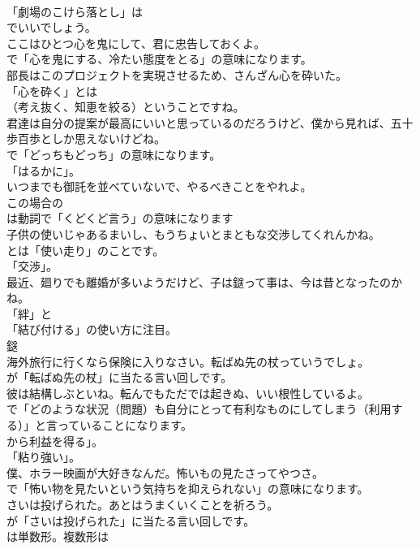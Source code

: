 \documentclass[8pt]{extreport}
\begin{document}
\begin{CJK}{UTF8}{min}
\\	「劇場のこけら落とし」は 
\\	でいいでしょう。	
\\	ここはひとつ心を鬼にして、君に忠告しておくよ。 
\\	で「心を鬼にする、冷たい態度をとる」の意味になります。	
\\	部長はこのプロジェクトを実現させるため、さんざん心を砕いた。 
\\	「心を砕く」とは 
\\	（考え抜く、知恵を絞る）ということですね。	
\\	君達は自分の提案が最高にいいと思っているのだろうけど、僕から見れば、五十歩百歩としか思えないけどね。 
\\	で「どっちもどっち」の意味になります。
\\	「はるかに」。	
\\	いつまでも御託を並べていないで、やるべきことをやれよ。 
\\	この場合の
\\	は動詞で「くどくど言う」の意味になります	
\\	子供の使いじゃあるまいし、もうちょいとまともな交渉してくれんかね。 
\\	とは「使い走り」のことです。
\\	「交渉」。	
\\	最近、廻りでも離婚が多いようだけど、子は鎹って事は、今は昔となったのかね。 
\\	「絆」と
\\	「結び付ける」の使い方に注目。	
\\	鎹
\\	海外旅行に行くなら保険に入りなさい。転ばぬ先の杖っていうでしょ。 
\\	が「転ばぬ先の杖」に当たる言い回しです。	
\\	彼は結構しぶといね。転んでもただでは起きぬ、いい根性しているよ。 
\\	で「どのような状況（問題）も自分にとって有利なものにしてしまう（利用する）」と言っていることになります。
\\	から利益を得る」。
\\	「粘り強い」。	
\\	僕、ホラー映画が大好きなんだ。怖いもの見たさってやつさ。 
\\	で「怖い物を見たいという気持ちを抑えられない」の意味になります。	
\\	さいは投げられた。あとはうまくいくことを祈ろう。 
\\	が「さいは投げられた」に当たる言い回しです。
\\	は単数形。複数形は

\end{CJK}
\end{document}
